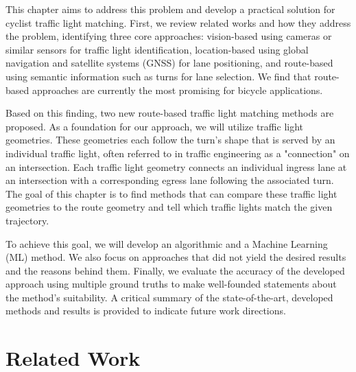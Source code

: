 This chapter aims to address this problem and develop a practical solution for cyclist traffic light matching. First, we review related works and how they address the problem, identifying three core approaches: vision-based using cameras or similar sensors for traffic light identification, location-based using global navigation and satellite systems (GNSS) for lane positioning, and route-based using semantic information such as turns for lane selection. We find that route-based approaches are currently the most promising for bicycle applications. 

Based on this finding, two new route-based traffic light matching methods are proposed. As a foundation for our approach, we will utilize traffic light geometries. These geometries each follow the turn's shape that is served by an individual traffic light, often referred to in traffic engineering as a "connection" on an intersection. Each traffic light geometry connects an individual ingress lane at an intersection with a corresponding egress lane following the associated turn. The goal of this chapter is to find methods that can compare these traffic light geometries to the route geometry and tell which traffic lights match the given trajectory.

To achieve this goal, we will develop an algorithmic and a Machine Learning (ML) method. We also focus on approaches that did not yield the desired results and the reasons behind them. Finally, we evaluate the accuracy of the developed approach using multiple ground truths to make well-founded statements about the method's suitability. A critical summary of the state-of-the-art, developed methods and results is provided to indicate future work directions.

\section{Related Work}

